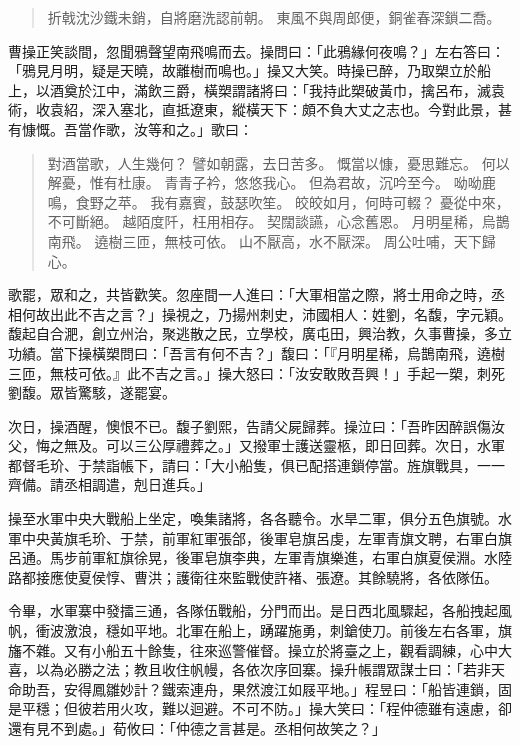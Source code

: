 \begin{quote}
折戟沈沙鐵未銷，自將磨洗認前朝。
東風不與周郎便，銅雀春深鎖二喬。
\end{quote}

曹操正笑談間，忽聞鴉聲望南飛鳴而去。操問曰：「此鴉緣何夜鳴？」左右答曰：「鴉見月明，疑是天曉，故離樹而鳴也。」操又大笑。時操已醉，乃取槊立於船上，以酒奠於江中，滿飲三爵，橫槊謂諸將曰：「我持此槊破黃巾，擒呂布，滅袁術，收袁紹，深入塞北，直抵遼東，縱橫天下：頗不負大丈之志也。今對此景，甚有慷慨。吾當作歌，汝等和之。」歌曰：

\begin{quote}
對酒當歌，人生幾何？
譬如朝露，去日苦多。
慨當以慷，憂思難忘。
何以解憂，惟有杜康。
青青子衿，悠悠我心。
但為君故，沉吟至今。
呦呦鹿鳴，食野之苹。
我有嘉賓，鼓瑟吹笙。
皎皎如月，何時可輟？
憂從中來，不可斷絕。
越陌度阡，枉用相存。
契闊談讌，心念舊恩。
月明星稀，烏鵲南飛。
遶樹三匝，無枝可依。
山不厭高，水不厭深。
周公吐哺，天下歸心。
\end{quote}

歌罷，眾和之，共皆歡笑。忽座間一人進曰：「大軍相當之際，將士用命之時，丞相何故出此不吉之言？」操視之，乃揚州刺史，沛國相人：姓劉，名馥，字元穎。馥起自合淝，創立州治，聚逃散之民，立學校，廣屯田，興治教，久事曹操，多立功績。當下操橫槊問曰：「吾言有何不吉？」馥曰：「『月明星稀，烏鵲南飛，遶樹三匝，無枝可依。』此不吉之言。」操大怒曰：「汝安敢敗吾興！」手起一槊，刺死劉馥。眾皆驚駭，遂罷宴。

次日，操酒醒，懊恨不已。馥子劉熙，告請父屍歸葬。操泣曰：「吾昨因醉誤傷汝父，悔之無及。可以三公厚禮葬之。」又撥軍士護送靈柩，即日回葬。次日，水軍都督毛玠、于禁詣帳下，請曰：「大小船隻，俱已配搭連鎖停當。旌旗戰具，一一齊備。請丞相調遣，剋日進兵。」

操至水軍中央大戰船上坐定，喚集諸將，各各聽令。水旱二軍，俱分五色旗號。水軍中央黃旗毛玠、于禁，前軍紅軍張郃，後軍皂旗呂虔，左軍青旗文聘，右軍白旗呂通。馬步前軍紅旗徐晃，後軍皂旗李典，左軍青旗樂進，右軍白旗夏侯淵。水陸路都接應使夏侯惇、曹洪；護衛往來監戰使許褚、張遼。其餘驍將，各依隊伍。

令畢，水軍寨中發擂三通，各隊伍戰船，分門而出。是日西北風驟起，各船拽起風帆，衝波激浪，穩如平地。北軍在船上，踴躍施勇，刺鎗使刀。前後左右各軍，旗旛不雜。又有小船五十餘隻，往來巡警催督。操立於將臺之上，觀看調練，心中大喜，以為必勝之法；教且收住帆幔，各依次序回寨。操升帳謂眾謀士曰：「若非天命助吾，安得鳳雛妙計？鐵索連舟，果然渡江如屐平地。」程昱曰：「船皆連鎖，固是平穩；但彼若用火攻，難以迴避。不可不防。」操大笑曰：「程仲德雖有遠慮，卻還有見不到處。」荀攸曰：「仲德之言甚是。丞相何故笑之？」

